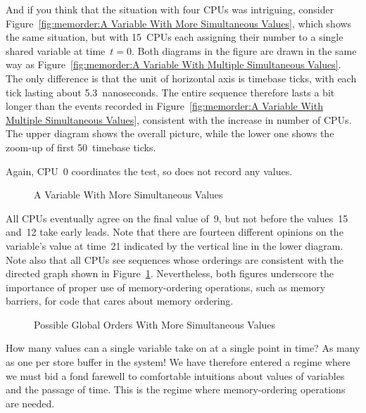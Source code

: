 And if you think that the situation with four CPUs was intriguing, consider
Figure~\ref{fig:memorder:A Variable With More Simultaneous Values},
which shows the same situation, but with 15~CPUs each assigning their
number to a single shared variable at time~$t=0$. Both diagrams in the
figure are drawn in the same way as
Figure~\ref{fig:memorder:A Variable With Multiple Simultaneous Values}.
The only difference is that the unit of horizontal axis is timebase ticks,
with each tick lasting about 5.3~nanoseconds.
The entire sequence therefore lasts a bit longer than the events recorded in
Figure~\ref{fig:memorder:A Variable With Multiple Simultaneous Values},
consistent with the increase in number of CPUs.
The upper diagram shows the overall picture, while the lower one shows
the zoom-up of first 50~timebase ticks.

Again, CPU~0 coordinates the test, so does not record any values.

\begin{figure}
\centering
{}
\caption{A Variable With More Simultaneous Values}
\end{figure}

All CPUs eventually agree on the final value of~9, but not before
the values~15 and~12 take early leads.
Note that there are fourteen different opinions on the variable's value
at time~21 indicated by the vertical line in the lower diagram.
Note also that all CPUs see sequences whose orderings are consistent with
the directed graph shown in
Figure~\ref{fig:memorder:Possible Global Orders With More Simultaneous Values}.
Nevertheless, both figures underscore the importance of
proper use of memory-ordering operations, such as memory barriers,
for code that cares about memory ordering.

\begin{figure}[htb]
\centering
{}
\caption{Possible Global Orders With More Simultaneous Values}
\label{fig:memorder:Possible Global Orders With More Simultaneous Values}
\end{figure}

How many values can a single variable take on at a single point in
time?
As many as one per store buffer in the system!
We have therefore entered a regime where we must bid a fond farewell to
comfortable intuitions about values of variables and the passage of time.
This is the regime where memory-ordering operations are needed.

